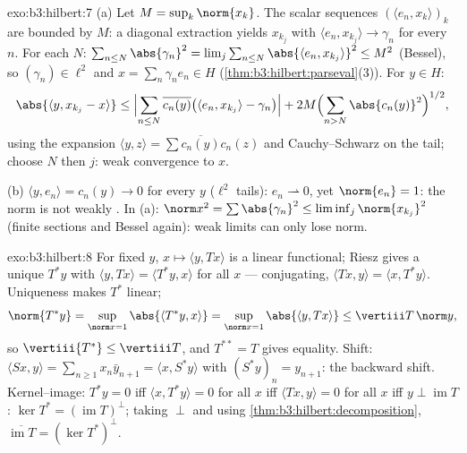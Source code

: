 \begin{solution}{exo:b3:hilbert:7}
(a) Let $M = \sup_k\norm{x_k}$. The scalar sequences
$(\langle e_n, x_k\rangle)_k$ are bounded by $M$: a diagonal
extraction yields $x_{k_j}$ with $\langle e_n, x_{k_j}\rangle
\to \gamma_n$ for every $n$. For each $N$: $\sum_{n\leq
N}\abs{\gamma_n}^2 = \lim_j\sum_{n\leq N}\abs{\langle e_n,
x_{k_j}\rangle}^2 \leq M^2$ (Bessel), so $(\gamma_n) \in
\ell^2$ and $x = \sum_n\gamma_ne_n \in H$
(\cref{thm:b3:hilbert:parseval}(3)). For $y \in H$:
\[
\abs{\langle y, x_{k_j} - x\rangle}
\leq \Bigl|\sum_{n\leq N}\overline{c_n(y)}\bigl(\langle e_n,
x_{k_j}\rangle - \gamma_n\bigr)\Bigr|
+ 2M\Bigl(\sum_{n>N}\abs{c_n(y)}^2\Bigr)^{1/2},
\]
using the expansion $\langle y, z\rangle =
\sum\overline{c_n(y)}c_n(z)$ and Cauchy--Schwarz on the tail;
choose $N$ then $j$: weak convergence to $x$.

(b) $\langle y, e_n\rangle = c_n(y) \to 0$ for every $y$
($\ell^2$ tails): $e_n \rightharpoonup 0$, yet $\norm{e_n} =
1$: the norm is not weakly . In (a): $\norm x^2 =
\sum\abs{\gamma_n}^2 \leq \liminf_j\norm{x_{k_j}}^2$ (finite
sections and Bessel again): weak limits can only lose norm.
\end{solution}

\begin{solution}{exo:b3:hilbert:8}
For fixed $y$, $x \mapsto \langle y, Tx\rangle$ is a
 linear functional; Riesz gives a unique $T^*y$ with
$\langle y, Tx\rangle = \langle T^*y, x\rangle$ for all $x$
--- conjugating, $\langle Tx, y\rangle = \langle x,
T^*y\rangle$. Uniqueness makes $T^*$ linear;
\[
\norm{T^*y} = \sup_{\norm x = 1}\abs{\langle T^*y, x\rangle}
= \sup_{\norm x=1}\abs{\langle y, Tx\rangle}
\leq \vertiii T\,\norm y,
\]
so $\vertiii{T^*} \leq \vertiii T$, and $T^{**} = T$ gives
equality. Shift: $\langle Sx, y\rangle = \sum_{n\geq1}
x_n\bar y_{n+1} = \langle x, S^*y\rangle$ with $(S^*y)_n =
y_{n+1}$: the backward shift. Kernel--image: $T^*y = 0$ iff
$\langle x, T^*y\rangle = 0$ for all $x$ iff $\langle Tx,
y\rangle = 0$ for all $x$ iff $y \perp \operatorname{im}T$:
$\ker T^* = (\operatorname{im}T)^\perp$; taking $\perp$ and
using \cref{thm:b3:hilbert:decomposition},
$\overline{\operatorname{im}T} = (\ker T^*)^\perp$.
\end{solution}

